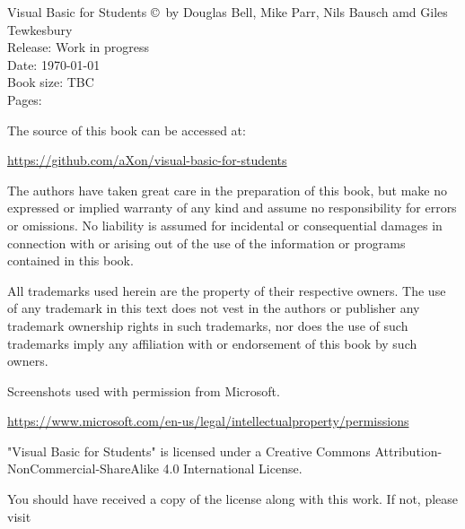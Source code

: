 %
%

{\footnotesize
\noindent
Visual Basic for Students \copyright\ by Douglas Bell, Mike Parr, Nils Bausch amd Giles Tewkesbury\\
Release: Work in progress \\
Date: \today\\
Book size: TBC \\ %
Pages: \ztotpages\\
\vspace{20pt}

\noindent
The source of this book can be accessed at:

\noindent
\url{https://github.com/aXon/visual-basic-for-students}

\vspace{15pt}

\noindent
The authors have taken great care in the preparation of this book, but make no expressed or implied warranty of any kind and assume no responsibility for errors or omissions. No liability is assumed for incidental or consequential damages in connection with or arising out of the use of the information or programs contained in this book.

\vspace{15pt}

\noindent
All trademarks used herein are the property of their respective owners. The use of any trademark in this text does not vest in the authors or publisher any trademark ownership rights in such trademarks, nor does the use of such trademarks imply any affiliation with or endorsement of this book by such owners.

\vspace{15pt}

\noindent
Screenshots used with permission from Microsoft.

\noindent
\url{https://www.microsoft.com/en-us/legal/intellectualproperty/permissions}

\vspace{15pt}


\noindent
\doclicenseIcon
"Visual Basic for Students" is licensed under a Creative Commons Attribution-NonCommercial-ShareAlike 4.0 International License.

You should have received a copy of the license along with this work. If not, please visit

}
